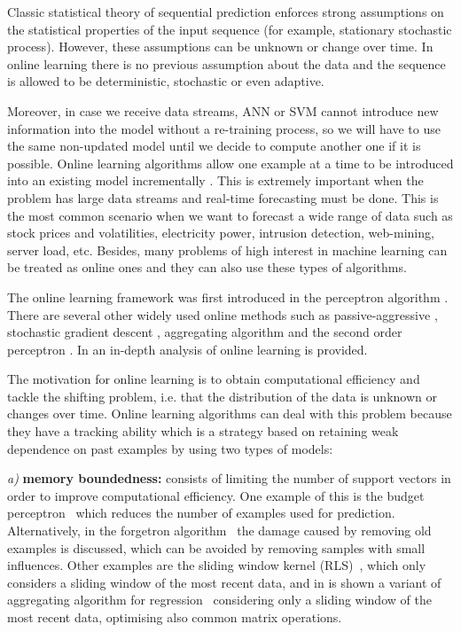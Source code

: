 Classic statistical theory of sequential prediction enforces strong assumptions on the statistical properties of the input sequence (for example, stationary stochastic process). However, these assumptions can be unknown or change over time. In online learning there is no previous assumption about the data and the sequence is allowed to be deterministic, stochastic or even adaptive.  

Moreover, in case we receive data streams, ANN or SVM cannot introduce new information into the model without a re-training process, so we will have to use the same non-updated model until we decide to compute another one if it is possible.  Online learning algorithms allow one example at a time to be introduced into an existing model incrementally \cite{vovk2005}. This is extremely important when the problem has large data streams and real-time forecasting must be done.  This is the most common scenario when we want to forecast a wide range of data such as stock prices and volatilities, electricity power, intrusion detection, web-mining, server load, etc.  Besides, many problems of high interest in machine learning can be treated as online ones and they can also use these types of algorithms.

The online learning framework was first introduced in the perceptron algorithm \cite{rosenblatt58}. There are several other widely used online methods such as passive-aggressive \cite{crammerETall2006}, stochastic gradient descent \cite{zhang2004}, aggregating algorithm \cite{vovk2001} and the second order perceptron \cite{cesa-bianchi2005}.  In \cite{cesa-bianchi2006} an in-depth analysis of online learning is provided.

The motivation for online learning is to obtain computational efficiency and tackle the shifting problem, i.e. that the distribution of the data is unknown or changes over time. Online learning algorithms can deal with this problem because they have a tracking ability which is a strategy based on retaining weak dependence on past examples by using two types of models: 

\textit{a)} \textbf{memory boundedness:} consists of limiting the number of support vectors in order to improve computational efficiency. One example of this is the budget perceptron~\cite{crammeretal2004} which reduces the number of examples used for prediction. Alternatively, in the forgetron algorithm~\cite{dekeletal2008} the damage caused by removing old examples is discussed, which can be avoided by removing samples with small influences. Other examples are the sliding window kernel (RLS)~\cite{vanvaerenberghetal2006}, which only considers a sliding window of the most recent data, and in \cite{arce+salinas2012} is shown a variant of aggregating algorithm for regression~\cite{vovk2001} considering only a sliding window of the most recent data, optimising also common matrix operations.

